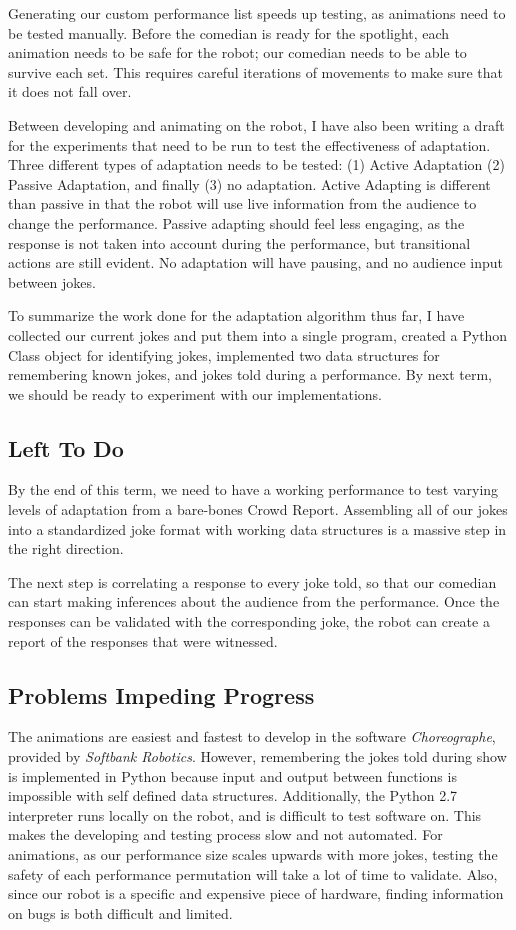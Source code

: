 ﻿\documentclass[onecolumn, draftclsnofoot,10pt, compsoc]{IEEEtran}
\begin{document}
Generating our custom performance list speeds up testing, as animations need to be tested manually. Before the comedian is ready for the spotlight, each animation needs to be safe for the robot; our comedian needs to be able to survive each set. This requires careful iterations of movements to make sure that it does not fall over.

Between developing and animating on the robot, I have also been writing a draft for the experiments that need to be run to test the effectiveness of adaptation. Three different types of adaptation needs to be tested: (1) Active Adaptation (2) Passive Adaptation, and finally (3) no adaptation. Active Adapting is different than passive in that the robot will use live information from the audience to change the performance. Passive adapting should feel less engaging, as the response is not taken into account during the performance, but transitional actions are still evident. No adaptation will have pausing, and no audience input between jokes.

To summarize the work done for the adaptation algorithm thus far, I have collected our current jokes and put them into a single program, created a Python Class object for identifying jokes, implemented two data structures for remembering known jokes, and jokes told during a performance. By next term, we should be ready to experiment with our implementations.

\subsection{Left To Do}
By the end of this term, we need to have a working performance to test varying levels of adaptation from a bare-bones Crowd Report. Assembling all of our jokes into a standardized joke format with working data structures is a massive step in the right direction. 

The next step is correlating a response to every joke told, so that our comedian can start making inferences about the audience from the performance. Once the responses can be validated with the corresponding joke, the robot can create a report of the responses that were witnessed.

\subsection{Problems Impeding Progress}
The animations are easiest and fastest to develop in the software \textit{Choreographe}, provided by \textit{Softbank Robotics}. However, remembering the jokes told during show is implemented in Python because input and output between functions is impossible with self defined data structures. Additionally, the Python 2.7 interpreter runs locally on the robot, and is difficult to test software on. This makes the developing and testing process slow and not automated. 
For animations, as our performance size scales upwards with more jokes, testing the safety of each performance permutation will take a lot of time to validate. Also, since our robot is a specific and expensive piece of hardware, finding information on bugs is both difficult and limited.
\end{document}
